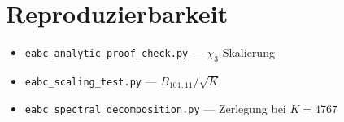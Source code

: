 \documentclass[11pt,a4paper]{article}
\begin{document}
\appendix
\section{Reproduzierbarkeit}

\begin{itemize}
  \item \texttt{eabc\_analytic\_proof\_check.py} --- $\chi_3$-Skalierung
  \item \texttt{eabc\_scaling\_test.py} --- $B_{101,11}/\sqrt{K}$
  \item \texttt{eabc\_spectral\_decomposition.py} --- Zerlegung bei $K=4767$
\end{itemize}
\end{document}
